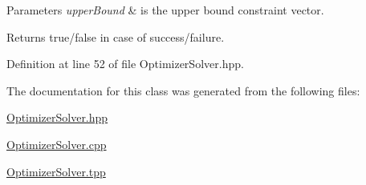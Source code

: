 \begin{DoxyParams}{Parameters}
{\em upper\+Bound} & is the upper bound constraint vector. \\
\hline
\end{DoxyParams}
\begin{DoxyReturn}{Returns}
true/false in case of success/failure. 
\end{DoxyReturn}


Definition at line 52 of file Optimizer\+Solver.\+hpp.



The documentation for this class was generated from the following files\+:\begin{DoxyCompactItemize}
\item 
\hyperlink{OptimizerSolver_8hpp}{Optimizer\+Solver.\+hpp}\item 
\hyperlink{OptimizerSolver_8cpp}{Optimizer\+Solver.\+cpp}\item 
\hyperlink{OptimizerSolver_8tpp}{Optimizer\+Solver.\+tpp}\end{DoxyCompactItemize}
